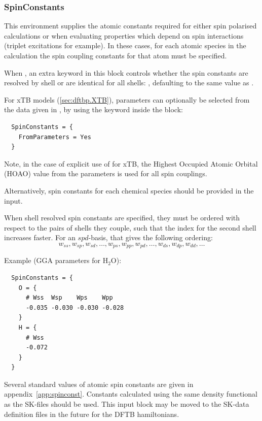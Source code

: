 \subsubsection{SpinConstants}
\label{sec:dftbp.SpinConstants}

This environment supplies the atomic constants required for either spin polarised
calculations or when evaluating properties which depend on spin interactions
(triplet excitations for example).  In these cases, for each atomic species in
the calculation the spin coupling constants for that atom must be specified.

When , an extra keyword in this block controls
whether the spin constants are resolved by shell or are identical for all
shells: , defaulting to the same value as
.

For xTB models (\ref{sec:dftbp.XTB}), parameters can optionally be
selected from the data given in \cite{Neugebauer-JCC-44-2120}, by
using the keyword  inside the 
block: 
\begin{verbatim}
  SpinConstants = {
    FromParameters = Yes
  }
\end{verbatim}
Note, in the case of explicit use of  for
xTB, the Highest Occupied Atomic Orbital (HOAO) value from the
parameters is used for all spin couplings.

Alternatively, spin constants for each chemical species should be
provided in the input.

When shell resolved spin constants are specified, they must be ordered with
respect to the pairs of shells they couple, such that the index for the second
shell increases faster. For an $spd$-basis, that gives the following ordering:
\begin{equation*}
  w_{ss}, w_{sp}, w_{sd}, \dots,
  w_{ps}, w_{pp}, w_{pd}, \dots,
  w_{ds}, w_{dp}, w_{dd}, \dots
\end{equation*}

Example (GGA parameters for H$_2$O):
\begin{verbatim}
  SpinConstants = {
    O = {
      # Wss  Wsp    Wps    Wpp
      -0.035 -0.030 -0.030 -0.028
    }
    H = {
      # Wss
      -0.072
    }
  }
\end{verbatim}

Several standard values of atomic spin constants are given in
appendix~\ref{app:spinconst}. Constants calculated using the same
density functional as the SK-files should be used. This input block
may be moved to the SK-data definition files in the future for the
DFTB hamiltonians.

